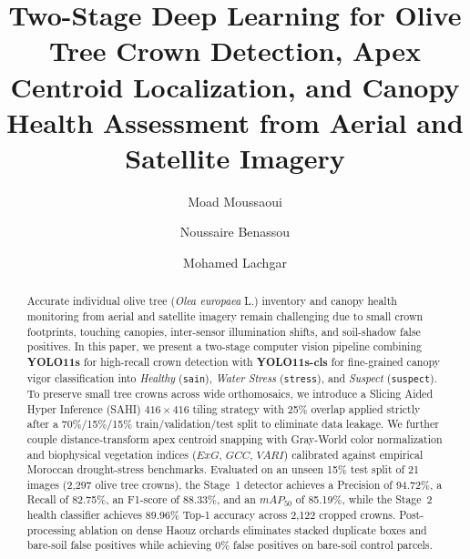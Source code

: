\documentclass[runningheads]{llncs}
\begin{document}
\title{Two-Stage Deep Learning for Olive Tree Crown Detection, Apex Centroid Localization, and Canopy Health Assessment from Aerial and Satellite Imagery}


\author{Moad Moussaoui \and
Noussaire Benassou \and
Mohamed Lachgar}



\maketitle

\begin{abstract}
Accurate individual olive tree (\textit{Olea europaea} L.) inventory and canopy health monitoring from aerial and satellite imagery remain challenging due to small crown footprints, touching canopies, inter-sensor illumination shifts, and soil-shadow false positives. In this paper, we present a two-stage computer vision pipeline combining \textbf{YOLO11s} for high-recall crown detection with \textbf{YOLO11s-cls} for fine-grained canopy vigor classification into \textit{Healthy} (\texttt{sain}), \textit{Water Stress} (\texttt{stress}), and \textit{Suspect} (\texttt{suspect}). To preserve small tree crowns across wide orthomosaics, we introduce a Slicing Aided Hyper Inference (SAHI) $416\times416$ tiling strategy with 25\% overlap applied strictly after a 70\%/15\%/15\% train/validation/test split to eliminate data leakage. We further couple distance-transform apex centroid snapping with Gray-World color normalization and biophysical vegetation indices ($ExG$, $GCC$, $VARI$) calibrated against empirical Moroccan drought-stress benchmarks. Evaluated on an unseen 15\% test split of 21 images (2,297 olive tree crowns), the Stage~1 detector achieves a Precision of 94.72\%, a Recall of 82.75\%, an F1-score of 88.33\%, and an $mAP_{50}$ of 85.19\%, while the Stage~2 health classifier achieves 89.96\% Top-1 accuracy across 2,122 cropped crowns. Post-processing ablation on dense Haouz orchards eliminates stacked duplicate boxes and bare-soil false positives while achieving 0\% false positives on bare-soil control parcels.

\end{abstract}
\end{document}
